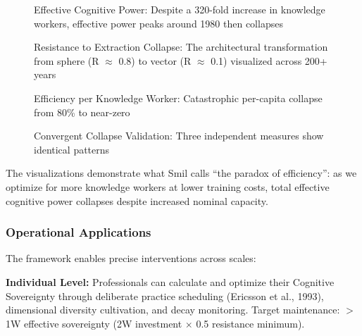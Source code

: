\begin{figure}[h]
\centering
\caption{Effective Cognitive Power: Despite a 320-fold increase in knowledge workers, effective power peaks around 1980 then collapses}
\label{fig:effective_cognitive_power}
\end{figure}

\begin{figure}[h]
\centering
\caption{Resistance to Extraction Collapse: The architectural transformation from sphere (R $\approx$ 0.8) to vector (R $\approx$ 0.1) visualized across 200+ years}
\label{fig:resistance_collapse}
\end{figure}

\begin{figure}[h]
\centering
\caption{Efficiency per Knowledge Worker: Catastrophic per-capita collapse from 80\% to near-zero}
\label{fig:efficiency_collapse}
\end{figure}

\begin{figure}[h]
\centering
\caption{Convergent Collapse Validation: Three independent measures show identical patterns}
\label{fig:convergent_validation}
\end{figure}

The visualizations demonstrate what Smil calls ``the paradox of efficiency'': as we optimize for more knowledge workers at lower training costs, total effective cognitive power collapses despite increased nominal capacity.

\subsubsection{Operational Applications}

The framework enables precise interventions across scales:

\textbf{Individual Level:} Professionals can calculate and optimize their Cognitive Sovereignty through deliberate practice scheduling (Ericsson et al., 1993), dimensional diversity cultivation, and decay monitoring. Target maintenance: $>$1W effective sovereignty (2W investment $\times$ 0.5 resistance minimum).

